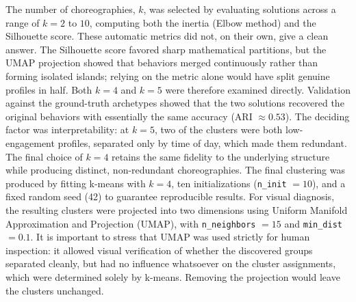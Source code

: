 The number of choreographies, $k$, was selected by evaluating solutions across a range of $k=2$ to $10$, computing both the inertia (Elbow method) and the Silhouette score. These automatic metrics did not, on their own, give a clean answer. The Silhouette score favored sharp mathematical partitions, but the UMAP projection showed that behaviors merged continuously rather than forming isolated islands; relying on the metric alone would have split genuine profiles in half. Both $k=4$ and $k=5$ were therefore examined directly. Validation against the ground-truth archetypes showed that the two solutions recovered the original behaviors with essentially the same accuracy (ARI $\approx 0.53$). The deciding factor was interpretability: at $k=5$, two of the clusters were both low-engagement profiles, separated only by time of day, which made them redundant. The final choice of $k=4$ retains the same fidelity to the underlying structure while producing distinct, non-redundant choreographies.
The final clustering was produced by fitting k-means with $k=4$, ten initializations (\texttt{n\_init} $= 10$), and a fixed random seed (42) to guarantee reproducible results. For visual diagnosis, the resulting clusters were projected into two dimensions using Uniform Manifold Approximation and Projection (UMAP), with \texttt{n\_neighbors} $= 15$ and \texttt{min\_dist} $= 0.1$. It is important to stress that UMAP was used strictly for human inspection: it allowed visual verification of whether the discovered groups separated cleanly, but had no influence whatsoever on the cluster assignments, which were determined solely by k-means. Removing the projection would leave the clusters unchanged.

